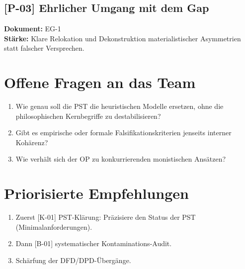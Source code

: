 \documentclass[11pt,a4paper]{article}
\begin{document}
\subsection*{[P-03] Ehrlicher Umgang mit dem Gap}
\textbf{Dokument:} EG-1\\
\textbf{Stärke:} Klare Relokation und Dekonstruktion materialistischer Asymmetrien statt falscher Versprechen.

\section*{Offene Fragen an das Team}
\begin{enumerate}
  \item Wie genau soll die PST die heuristischen Modelle ersetzen, ohne die philosophischen Kernbegriffe zu destabilisieren?
  \item Gibt es empirische oder formale Falsifikationskriterien jenseits interner Kohärenz?
  \item Wie verhält sich der OP zu konkurrierenden monistischen Ansätzen?
\end{enumerate}

\section*{Priorisierte Empfehlungen}
\begin{enumerate}
  \item Zuerst [K-01] PST-Klärung: Präzisiere den Status der PST (Minimalanforderungen).
  \item Dann [B-01] systematischer Kontaminations-Audit.
  \item Schärfung der DFD/DPD-Übergänge.
\end{enumerate}
\end{document}
